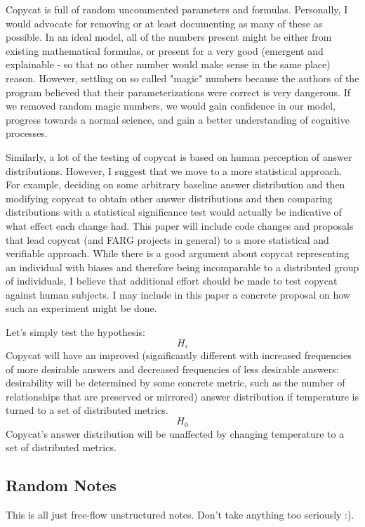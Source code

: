 \documentclass[a4paper]{article}
\begin{document}
Copycat is full of random uncommented parameters and formulas. Personally, I would advocate for removing or at least documenting as many of these as possible. In an ideal model, all of the numbers present might be either from existing mathematical formulas, or present for a very good (emergent and explainable - so that no other number would make sense in the same place) reason. However, settling on so called "magic" numbers because the authors of the program believed that their parameterizations were correct is very dangerous. If we removed random magic numbers, we would gain confidence in our model, progress towards a normal science, and gain a better understanding of cognitive processes. 

Similarly, a lot of the testing of copycat is based on human perception of answer distributions. However, I suggest that we move to a more statistical approach. For example, deciding on some arbitrary baseline answer distribution and then modifying copycat to obtain other answer distributions and then comparing distributions with a statistical significance test would actually be indicative of what effect each change had. This paper will include code changes and proposals that lead copycat (and FARG projects in general) to a more statistical and verifiable approach.
While there is a good argument about copycat representing an individual with biases and therefore being incomparable to a distributed group of individuals, I believe that additional effort should be made to test copycat against human subjects.  I may include in this paper a concrete proposal on how such an experiment might be done.

Let's simply test the hypothesis: \[H_i\] Copycat will have an improved (significantly different with increased frequencies of more desirable answers and decreased frequencies of less desirable answers: desirability will be determined by some concrete metric, such as the number of relationships that are preserved or mirrored) answer distribution if temperature is turned to a set of distributed metrics. \[H_0\] Copycat's answer distribution will be unaffected by changing temperature to a set of distributed metrics.

\subsection{Random Notes}

This is all just free-flow unstructured notes. Don't take anything too seriously :).
\end{document}
